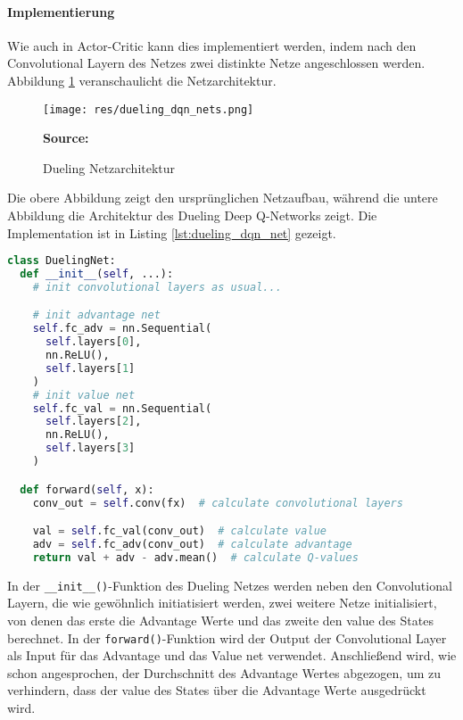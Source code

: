 \documentclass[11pt]{scrartcl}
\newcommand{\source}[1]{\vspace{-5pt} \caption*{\hfill \textbf{Source:} {#1}} }
\begin{document}
\paragraph*{Implementierung}
\noindent
\newline
Wie auch in Actor-Critic kann dies implementiert werden, indem nach den Convolutional
Layern des Netzes zwei distinkte Netze angeschlossen werden. Abbildung
\ref{fig:dueling_dqn_nets} veranschaulicht die Netzarchitektur.
\begin{figure}[htp]
  \centering
  \texttt{[image: res/dueling\_dqn\_nets.png]}
  \caption{Dueling Netzarchitektur}
  \source{\cite[~S.283 - Chapter 7 - Figure 11]{L2018}}
  \label{fig:dueling_dqn_nets}
\end{figure}
\noindent
Die obere Abbildung zeigt den ursprünglichen Netzaufbau, während die untere Abbildung die
Architektur des Dueling Deep Q-Networks zeigt. Die Implementation ist in Listing
\ref{lst:dueling_dqn_net} gezeigt.
\begin{lstlisting}[language=Python, caption=Dueling Net Implementation,
label=lst:dueling_dqn_net]
class DuelingNet:
  def __init__(self, ...):
    # init convolutional layers as usual...

    # init advantage net
    self.fc_adv = nn.Sequential(
      self.layers[0],
      nn.ReLU(),
      self.layers[1]
    )
    # init value net
    self.fc_val = nn.Sequential(
      self.layers[2],
      nn.ReLU(),
      self.layers[3]
    )

  def forward(self, x):
    conv_out = self.conv(fx)  # calculate convolutional layers

    val = self.fc_val(conv_out)  # calculate value
    adv = self.fc_adv(conv_out)  # calculate advantage
    return val + adv - adv.mean()  # calculate Q-values
\end{lstlisting}
\noindent
In der \lstinline!__init__()!-Funktion des Dueling Netzes werden neben den Convolutional
Layern, die wie gewöhnlich initiatisiert werden, zwei weitere Netze initialisiert, von denen
das erste die Advantage Werte und das zweite den value des States berechnet.
In der \lstinline!forward()!-Funktion wird der Output der Convolutional Layer
als Input für das Advantage und das Value net verwendet. Anschließend wird, wie schon
angesprochen, der Durchschnitt des Advantage Wertes abgezogen, um zu verhindern, dass der
value des States über die Advantage Werte ausgedrückt wird.
\end{document}
